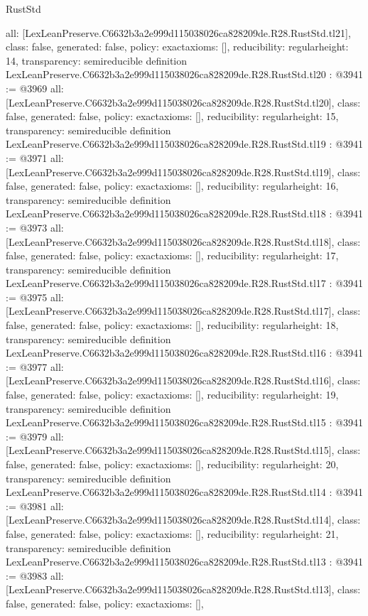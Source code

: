 \begin{lexlean}{RustStd}
\begin{coremodule}
{  all: [LexLeanPreserve.C6632b3a2e999d115038026ca828209de.R28.RustStd.tl21],
  class: false,
  generated: false,
  policy: exact{axioms: []},
  reducibility: regular{height: 14},
  transparency: semireducible
}
definition LexLeanPreserve.C6632b3a2e999d115038026ca828209de.R28.RustStd.tl20 : @3941 := @3969 {
  all: [LexLeanPreserve.C6632b3a2e999d115038026ca828209de.R28.RustStd.tl20],
  class: false,
  generated: false,
  policy: exact{axioms: []},
  reducibility: regular{height: 15},
  transparency: semireducible
}
definition LexLeanPreserve.C6632b3a2e999d115038026ca828209de.R28.RustStd.tl19 : @3941 := @3971 {
  all: [LexLeanPreserve.C6632b3a2e999d115038026ca828209de.R28.RustStd.tl19],
  class: false,
  generated: false,
  policy: exact{axioms: []},
  reducibility: regular{height: 16},
  transparency: semireducible
}
definition LexLeanPreserve.C6632b3a2e999d115038026ca828209de.R28.RustStd.tl18 : @3941 := @3973 {
  all: [LexLeanPreserve.C6632b3a2e999d115038026ca828209de.R28.RustStd.tl18],
  class: false,
  generated: false,
  policy: exact{axioms: []},
  reducibility: regular{height: 17},
  transparency: semireducible
}
definition LexLeanPreserve.C6632b3a2e999d115038026ca828209de.R28.RustStd.tl17 : @3941 := @3975 {
  all: [LexLeanPreserve.C6632b3a2e999d115038026ca828209de.R28.RustStd.tl17],
  class: false,
  generated: false,
  policy: exact{axioms: []},
  reducibility: regular{height: 18},
  transparency: semireducible
}
definition LexLeanPreserve.C6632b3a2e999d115038026ca828209de.R28.RustStd.tl16 : @3941 := @3977 {
  all: [LexLeanPreserve.C6632b3a2e999d115038026ca828209de.R28.RustStd.tl16],
  class: false,
  generated: false,
  policy: exact{axioms: []},
  reducibility: regular{height: 19},
  transparency: semireducible
}
definition LexLeanPreserve.C6632b3a2e999d115038026ca828209de.R28.RustStd.tl15 : @3941 := @3979 {
  all: [LexLeanPreserve.C6632b3a2e999d115038026ca828209de.R28.RustStd.tl15],
  class: false,
  generated: false,
  policy: exact{axioms: []},
  reducibility: regular{height: 20},
  transparency: semireducible
}
definition LexLeanPreserve.C6632b3a2e999d115038026ca828209de.R28.RustStd.tl14 : @3941 := @3981 {
  all: [LexLeanPreserve.C6632b3a2e999d115038026ca828209de.R28.RustStd.tl14],
  class: false,
  generated: false,
  policy: exact{axioms: []},
  reducibility: regular{height: 21},
  transparency: semireducible
}
definition LexLeanPreserve.C6632b3a2e999d115038026ca828209de.R28.RustStd.tl13 : @3941 := @3983 {
  all: [LexLeanPreserve.C6632b3a2e999d115038026ca828209de.R28.RustStd.tl13],
  class: false,
  generated: false,
  policy: exact{axioms: []},
}
\end{coremodule}
\end{lexlean}
